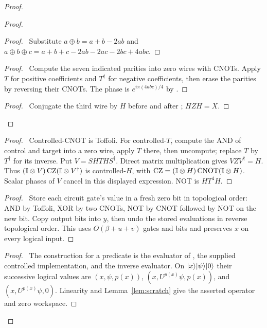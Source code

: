 \begin{proof}
 \begin{proof}
  \begin{proof}\pf\ Substitute $a\oplus b=a+b-2ab$ and
  $a\oplus b\oplus c=a+b+c-2ab-2ac-2bc+4abc$.\end{proof}
  \begin{proof}\pf\ Compute the seven indicated parities into zero
  wires with CNOTs. Apply $T$ for positive coefficients and $T^\dagger$
  for negative coefficients, then erase the parities by reversing their
  CNOTs. The phase is $e^{i\pi(4abc)/4}$ by
  .\end{proof}
  \qedstep
  \begin{proof}\pf\ Conjugate the third wire by $H$ before and after
  ; $HZH=X$.\end{proof}
 \end{proof}
 \begin{proof}\pf\ Controlled-CNOT is Toffoli. For controlled-$T$,
 compute the AND of control and target into a zero wire, apply $T$ there,
 then uncompute; replace $T$ by $T^\dagger$ for its inverse. Put
 $V=SHTHS^\dagger$. Direct matrix multiplication gives $VZV^\dagger=H$.
 Thus $(\mathbb{I}\otimes V)\operatorname{CZ}(\mathbb{I}\otimes V^\dagger)$ is
 controlled-$H$, with $\operatorname{CZ}=(\mathbb{I}\otimes H)
 \operatorname{CNOT}(\mathbb{I}\otimes H)$. Scalar phases of $V$ cancel in
 this displayed expression. NOT is $HT^4H$.\end{proof}
 \begin{proof}\pf\ Store each circuit gate's value in a fresh zero
 bit in topological order: AND by Toffoli, XOR by two CNOTs, NOT by
 CNOT followed by NOT on the new bit. Copy output bits into $y$, then
 undo the stored evaluations in reverse topological order. This uses
 $O(\beta+u+v)$ gates and bits
 and preserves $x$ on every logical input.\end{proof}
 \qedstep
 \begin{proof}\pf\ The construction for a predicate is the evaluator
 of , the supplied controlled implementation,
 and the inverse evaluator. On $\lvert x\rangle\lvert \psi\rangle\lvert 0\rangle$ their successive
 logical values are $(x,\psi,p(x))$, $(x,U^{p(x)}\psi,p(x))$, and
 $(x,U^{p(x)}\psi,0)$. Linearity and Lemma~\ref{lem:scratch} give the
 asserted operator and zero workspace.\end{proof}
\end{proof}

